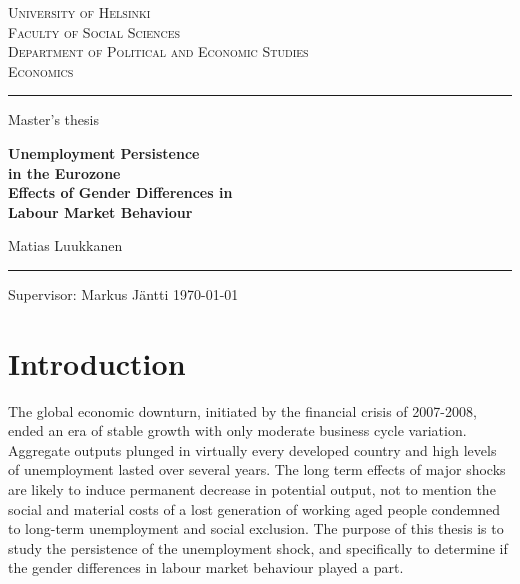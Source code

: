 \documentclass[12pt,a4paper,english]{article}
\begin{document}
\ddmmyyyydate
\renewcommand{\dateseparator}{.}
\parskip 2mm
\parindent 0mm

\begin{titlepage}
  \setlength{\parindent}{0mm}
  \sloppy
  \large \textsc{University of Helsinki \\
				 Faculty of Social Sciences \\
                 Department of Political and Economic Studies \\
                 Economics}
  \vspace{5mm}

  \hrule height3pt
  \vspace{20mm}

  \begin{center}
    \large Master's thesis
    \linebreak \vfill   

    \huge \textbf{Unemployment Persistence \\ in the Eurozone} \\
    \vspace{2mm}
        \Large \textbf{Effects of Gender Differences in \\ Labour Market Behaviour}
    \vspace{20mm}

    \Large Matias Luukkanen \linebreak
    
    \vfill

  \end{center}
  \hrule height2pt
  \vspace{15mm}

  Supervisor: Markus Jäntti
  \hfill
  \today    
\end{titlepage}




\setcounter{page}{1}
\tableofcontents
\clearpage
\renewcommand{\baselinestretch}{1.50}\normalsize
\section{Introduction}                                    

The global economic downturn, initiated by the financial crisis of 2007-2008, ended an era of stable growth with only moderate business cycle variation. Aggregate outputs plunged in virtually every developed country and high levels of unemployment lasted over several years. The long term effects of major shocks are likely to induce permanent decrease in potential output, not to mention the social and material costs of a lost generation of working aged people condemned to long-term unemployment and social exclusion. The purpose of this thesis is to study the persistence of the unemployment shock, and specifically to determine if the gender differences in labour market behaviour played a part.
\end{document}
